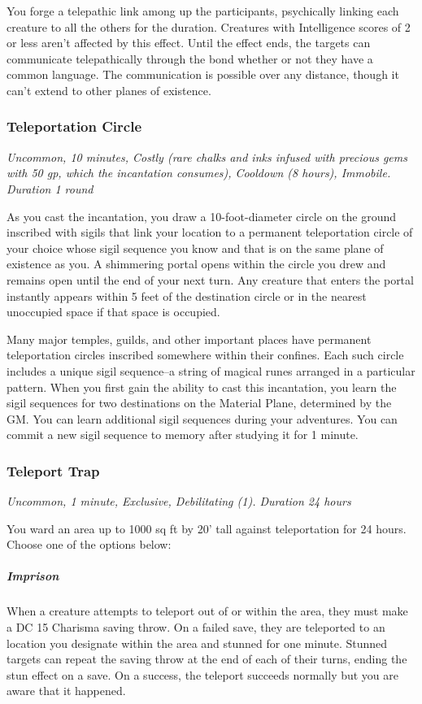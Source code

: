 You forge a telepathic link among up the participants, psychically linking each creature to all the others for the duration. Creatures with Intelligence scores of 2 or less aren't affected by this effect. Until the effect ends, the targets can communicate telepathically through the bond whether or not they have a common language. The communication is possible over any distance, though it can't extend to other planes of existence.

\subsubsection{Teleportation Circle }
\textit{Uncommon, 10 minutes, Costly (rare chalks and inks infused with precious gems with 50 gp, which the incantation consumes), Cooldown (8 hours), Immobile. Duration 1 round}

As you cast the incantation, you draw a 10-foot-diameter circle on the ground inscribed with sigils that link your location to a permanent teleportation circle of your choice whose sigil sequence you know and that is on the same plane of existence as you. A shimmering portal opens within the circle you drew and remains open until the end of your next turn. Any creature that enters the portal instantly appears within 5 feet of the destination circle or in the nearest unoccupied space if that space is occupied.

Many major temples, guilds, and other important places have permanent teleportation circles inscribed somewhere within their confines. Each such circle includes a unique sigil sequence--a string of magical runes arranged in a particular pattern. When you first gain the ability to cast this incantation, you learn the sigil sequences for two destinations on the Material Plane, determined by the GM. You can learn additional sigil sequences during your adventures. You can commit a new sigil sequence to memory after studying it for 1 minute.

\subsubsection{Teleport Trap}
\textit{Uncommon, 1 minute, Exclusive, Debilitating (1). Duration 24 hours}

You ward an area up to 1000 sq ft by 20' tall against teleportation for 24 hours. Choose one of the options below:
\subparagraph*{Imprison} When a creature attempts to teleport out of or within the area, they must make a DC 15 Charisma saving throw. On a failed save, they are teleported to an location you designate within the area and stunned for one minute. Stunned targets can repeat the saving throw at the end of each of their turns, ending the stun effect on a save. On a success, the teleport succeeds normally but you are aware that it happened.

